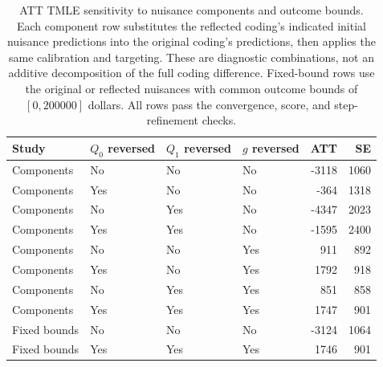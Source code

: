 \begin{table}[ht]
\centering
\small
\caption{ATT TMLE sensitivity to nuisance components and outcome bounds.
Each component row substitutes the reflected coding's indicated initial
nuisance predictions into the original coding's predictions, then applies
the same calibration and targeting. These are diagnostic combinations,
not an additive decomposition of the full coding difference.
Fixed-bound rows use the original or reflected nuisances with common
outcome bounds of $[0,200000]$ dollars. All rows pass the convergence,
score, and step-refinement checks.}
\label{tab:causal-sensitivity}

\begin{tabular}{llllrr}
\toprule
Study & $Q_0$ reversed & $Q_1$ reversed & $g$ reversed & ATT & SE\\
\midrule
Components & No & No & No & -3118 & 1060\\
Components & Yes & No & No & -364 & 1318\\
Components & No & Yes & No & -4347 & 2023\\
Components & Yes & Yes & No & -1595 & 2400\\
Components & No & No & Yes & 911 & 892\\
\addlinespace
Components & Yes & No & Yes & 1792 & 918\\
Components & No & Yes & Yes & 851 & 858\\
Components & Yes & Yes & Yes & 1747 & 901\\
Fixed bounds & No & No & No & -3124 & 1064\\
Fixed bounds & Yes & Yes & Yes & 1746 & 901\\
\bottomrule
\end{tabular}
\end{table}
